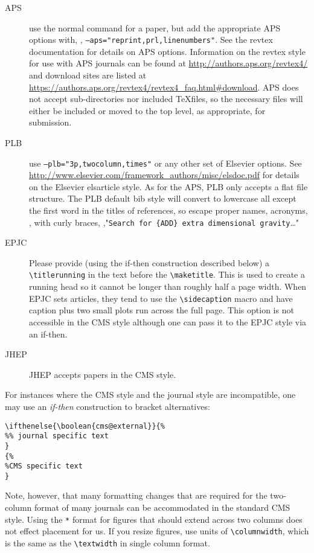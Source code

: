 \begin{description}
\item[APS] use the normal command for a paper, but add the appropriate APS options with, \eg, \texttt{--aps="reprint,prl,linenumbers"}. See the revtex documentation for details on APS options. Information on the revtex style for use with APS journals can be found at \url{http://authors.aps.org/revtex4/} and download sites are listed at \url{https://authors.aps.org/revtex4/revtex4_faq.html#download}. APS does not accept sub-directories nor included \TeX files, so the necessary files will either be included or moved to the top level, as appropriate, for submission.
\item[PLB] use \texttt{--plb="3p,twocolumn,times"} or any other set of Elsevier options. See \url{http://www.elsevier.com/framework_authors/misc/elsdoc.pdf} for details on the Elsevier elsarticle style. As for the APS, PLB only accepts a flat file structure. The PLB default bib style will convert to lowercase all except the first word in the titles of references, so escape proper names, acronyms, \etc, with curly braces, \eg,\linebreak[4] "\verb|Search for {ADD} extra dimensional gravity|\ldots"
\item[EPJC] Please provide (using the if-then construction described below) a \verb|\titlerunning| in the text before the \verb|\maketitle|. This is used to create a running head so it cannot be longer than roughly half a page width. When EPJC sets articles, they tend to use the \verb|\sidecaption| macro and have caption plus two small plots run across the full page. This option is not accessible in the CMS style although one can pass it to the EPJC style via an if-then.
\item[JHEP] JHEP accepts papers in the CMS style.

\end{description}

For instances where the CMS style and the journal style are incompatible, one may use an \textit{if-then} construction to bracket alternatives:

\begin{verbatim}
\ifthenelse{\boolean{cms@external}}{%
%% journal specific text
}
{%
%CMS specific text
}
\end{verbatim}

Note, however, that many formatting changes that are required for the two-column format of many journals can be accommodated in the standard CMS style. Using the \texttt{*} format for figures that should extend across two columns does not effect placement for us. If you resize figures, use units of \verb|\columnwidth|, which is the same as the \verb|\textwidth| in single column format.
